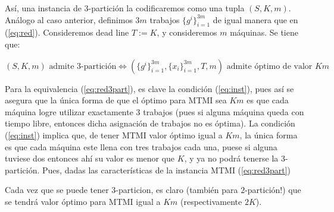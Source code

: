 \documentclass[10pt]{article}
\theoremstyle{plain}
\theoremstyle{definition}
\begin{document}
Así, una instancia de $3$-partición la codificaremos como una tupla $(S, K, m)$. Análogo al caso anterior, definimos $3m$ trabajos $\{g^i\}_{i=1}^{3m}$ de igual manera que en (\ref{eq:red}). Consideremos dead line $T:=K$, y consideremos $m$ máquinas. Se tiene que:

\begin{equation}
\label{eq:red3part}
(S, K, m) \text{ admite $3$-partición} \Longleftrightarrow (\{g^i\}_{i=1}^{3m}, \{x_i\}_{i=1}^{3m}, T, m)
\text{ admite óptimo de valor $Km$}
\end{equation}

Para la equivalencia (\ref{eq:red3part}), es clave la condición  (\ref{eq:inst}), pues así se asegura que la única forma de que el óptimo para MTMI sea $Km$ es que cada máquina logre utilizar exactamente 3 trabajos (pues si alguna máquina queda con tiempo libre, entonces dicha asignación de trabajos no es óptima). La condición (\ref{eq:inst}) implica que, de tener MTMI valor óptimo igual a $Km$, la única forma es que cada máquina este llena con tres trabajos cada una, puese si alguna tuviese dos entonces ahí su valor es menor que $K$, y ya no podrá tenerse la 3-partición. Pues, dadas las características de la instancia MTMI (\ref{eq:red3part})

Cada vez que se puede tener 3-particion, es claro (también para $2$-partición!) que se tendrá valor óptimo para MTMI igual a $Km$ (respectivamente $2K$).
\end{document}
